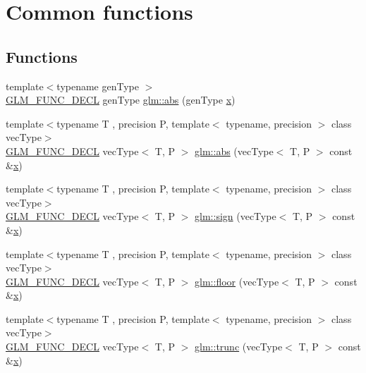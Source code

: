 \hypertarget{group__core__func__common}{}\section{Common functions}
\label{group__core__func__common}
\subsection*{Functions}
\begin{DoxyCompactItemize}
\item 
{\footnotesize template$<$typename gen\+Type $>$ }\\\mbox{\hyperlink{setup_8hpp_ab2d052de21a70539923e9bcbf6e83a51}{G\+L\+M\+\_\+\+F\+U\+N\+C\+\_\+\+D\+E\+CL}} gen\+Type \mbox{\hyperlink{group__core__func__common_ga693d77696ff36572a0da79efec965acd}{glm\+::abs}} (gen\+Type \mbox{\hyperlink{glad_8h_a92d0386e5c19fb81ea88c9f99644ab1d}{x}})
\item 
{\footnotesize template$<$typename T , precision P, template$<$ typename, precision $>$ class vec\+Type$>$ }\\\mbox{\hyperlink{setup_8hpp_ab2d052de21a70539923e9bcbf6e83a51}{G\+L\+M\+\_\+\+F\+U\+N\+C\+\_\+\+D\+E\+CL}} vec\+Type$<$ T, P $>$ \mbox{\hyperlink{group__core__func__common_ga4e8c1187dff84385308245090d440b35}{glm\+::abs}} (vec\+Type$<$ T, P $>$ const \&\mbox{\hyperlink{glad_8h_a92d0386e5c19fb81ea88c9f99644ab1d}{x}})
\item 
{\footnotesize template$<$typename T , precision P, template$<$ typename, precision $>$ class vec\+Type$>$ }\\\mbox{\hyperlink{setup_8hpp_ab2d052de21a70539923e9bcbf6e83a51}{G\+L\+M\+\_\+\+F\+U\+N\+C\+\_\+\+D\+E\+CL}} vec\+Type$<$ T, P $>$ \mbox{\hyperlink{group__core__func__common_gac3446b4138e0b8757561c07cd19f084d}{glm\+::sign}} (vec\+Type$<$ T, P $>$ const \&\mbox{\hyperlink{glad_8h_a92d0386e5c19fb81ea88c9f99644ab1d}{x}})
\item 
{\footnotesize template$<$typename T , precision P, template$<$ typename, precision $>$ class vec\+Type$>$ }\\\mbox{\hyperlink{setup_8hpp_ab2d052de21a70539923e9bcbf6e83a51}{G\+L\+M\+\_\+\+F\+U\+N\+C\+\_\+\+D\+E\+CL}} vec\+Type$<$ T, P $>$ \mbox{\hyperlink{group__core__func__common_ga568b822b78f045f77c3325e165b44d5d}{glm\+::floor}} (vec\+Type$<$ T, P $>$ const \&\mbox{\hyperlink{glad_8h_a92d0386e5c19fb81ea88c9f99644ab1d}{x}})
\item 
{\footnotesize template$<$typename T , precision P, template$<$ typename, precision $>$ class vec\+Type$>$ }\\\mbox{\hyperlink{setup_8hpp_ab2d052de21a70539923e9bcbf6e83a51}{G\+L\+M\+\_\+\+F\+U\+N\+C\+\_\+\+D\+E\+CL}} vec\+Type$<$ T, P $>$ \mbox{\hyperlink{group__core__func__common_ga634cdbf8b37edca03f2248450570fd54}{glm\+::trunc}} (vec\+Type$<$ T, P $>$ const \&\mbox{\hyperlink{glad_8h_a92d0386e5c19fb81ea88c9f99644ab1d}{x}})

\end{DoxyCompactItemize}
